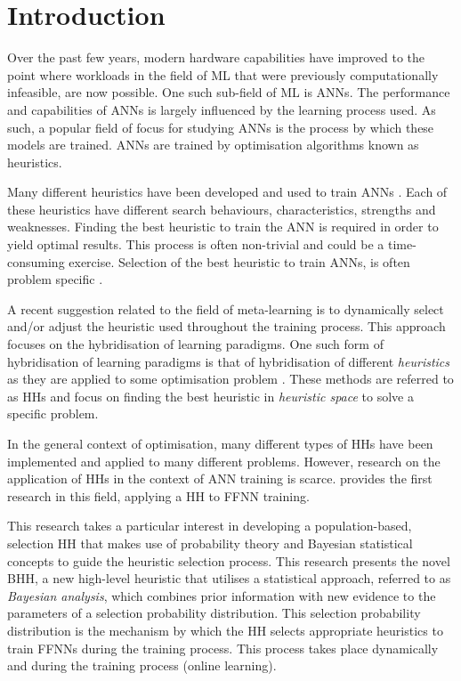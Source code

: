 \section{Introduction}
\label{sec:introduction}

Over the past few years, modern hardware capabilities have improved to the point where workloads in the field of \acs{ML} that were previously computationally infeasible, are now possible. One such sub-field of \acs{ML} is \acp{ANN}. The performance and capabilities of \acp{ANN} is largely influenced by the learning process used. As such, a popular field of focus for studying \acp{ANN} is the process by which these models are trained. \acp{ANN} are trained by optimisation algorithms known as heuristics.

Many different heuristics have been developed and used to train \acp{ANN}  \cite{ref:gudise:2003, ref:rakitianskaia:2012, ref:montana:1989}. Each of these heuristics have different search behaviours, characteristics, strengths and weaknesses. Finding the best heuristic to train the \acs{ANN} is required in order to yield optimal results. This process is often non-trivial and could be a time-consuming exercise.  Selection of the best heuristic to train \acp{ANN}, is often problem specific  \cite{ref:allen:1996, ref:drake:2020, ref:pillay:2018}.

A recent suggestion related to the field of meta-learning is to dynamically select and/or adjust the heuristic used throughout the training process. This approach focuses on the hybridisation of learning paradigms. One such form of hybridisation of learning paradigms is that of hybridisation of different \textit{heuristics} as they are applied to some optimisation problem  \cite{ref:burke:2013}. These methods are referred to as \acfp{HH} and focus on finding the best heuristic in \textit{heuristic space} to solve a specific problem.

In the general context of optimisation, many different types of \acp{HH} have been implemented and applied to many different problems. However, research on the application of \acp{HH} in the context of \acs{ANN} training is scarce. \citeauthor{ref:nel:2021}  \cite{ref:nel:2021} provides the first research in this field, applying a \acs{HH} to \acs{FFNN} training.

This research takes a particular interest in developing a population-based, selection \acs{HH} that makes use of probability theory and Bayesian statistical concepts to guide the heuristic selection process. This research presents the novel \Acf{BHH}, a new high-level heuristic that utilises a statistical approach, referred to as \textit{Bayesian analysis}, which combines prior information with new evidence to the parameters of a selection probability distribution. This selection probability distribution is the mechanism by which the \acs{HH} selects appropriate heuristics to train \acp{FFNN} during the training process. This process takes place dynamically and during the training process (online learning).

